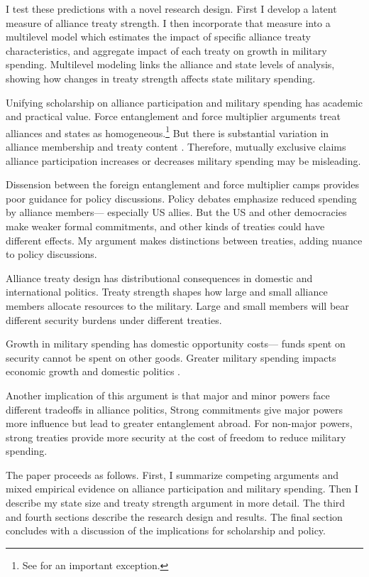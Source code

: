 \documentclass[12pt]{article}
\begin{document}
I test these predictions with a novel research design.
First I develop a latent measure of alliance treaty strength. 
I then incorporate that measure into a multilevel model which estimates the impact of specific alliance treaty characteristics, and aggregate impact of each treaty on growth in military spending.
Multilevel modeling links the alliance and state levels of analysis, showing how changes in treaty strength affects state military spending. 


Unifying scholarship on alliance participation and military spending has academic and practical value.
Force entanglement and force multiplier arguments treat alliances and states as homogeneous.\footnote{See \citet{DigiuseppePoast2016} for an important exception.} 
But there is substantial variation in alliance membership and treaty content \citep{Leedsetal2002}. 
Therefore, mutually exclusive claims alliance participation increases or decreases military spending may be misleading. 


Dissension between the foreign entanglement and force multiplier camps provides poor guidance for policy discussions. 
Policy debates emphasize reduced spending by alliance members--- especially US allies. 
But the US and other democracies make weaker formal commitments, and other kinds of treaties could have different effects. 
My argument makes distinctions between treaties, adding nuance to policy discussions. 


Alliance treaty design has distributional consequences in domestic and international politics.
Treaty strength shapes how large and small alliance members allocate resources to the military. 
Large and small members will bear different security burdens under different treaties.


Growth in military spending has domestic opportunity costs--- funds spent on security cannot be spent on other goods. 
Greater military spending impacts economic growth \citep{ShinWard1999, AlptekinLevine2012} and domestic politics \citep{Narizny2003, WhittenWilliams2011, Williams2015}.


Another implication of this argument is that major and minor powers face different tradeoffs in alliance politics, 
Strong commitments give major powers more influence but lead to greater entanglement abroad.
For non-major powers, strong treaties provide more security at the cost of freedom to reduce military spending. 


The paper proceeds as follows. 
First, I summarize competing arguments and mixed empirical evidence on alliance participation and military spending. 
Then I describe my state size and treaty strength argument in more detail. 
The third and fourth sections describe the research design and results. 
The final section concludes with a discussion of the implications for scholarship and policy.  
\end{document}
